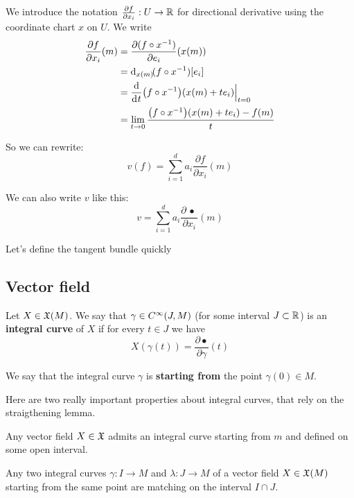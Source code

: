 	We introduce the notation $\frac{\partial{f}}{\partial{x_i}}: U \to \mathbb{R}$ for directional derivative using the coordinate chart $x$ on $U$. We write
	\begin{align*}
		\frac{\partial{f}}{\partial{x_i}}(m) &= \frac{\partial{(f \circ x^{-1})}}{\partial{e_i}}(x(m)) \\
		                                     &= \di[x(m)](f \circ x^{-1})[e_i] \\
		                                     &= \frac{\d}{\di{t}} \big( f \circ x^{-1} \big)(x(m) + t e_i) \Big|_{t=0} \\
		                                     &= \lim_{t \to 0} \frac{\big( f \circ x^{-1} \big)(x(m) + t e_i) - f(m)}{t}
	\end{align*}

	So we can rewrite:
	$$
		v(f) = \sum_{i=1}^d a_i \frac{\partial f}{\partial{x_i}}(m)
	$$

	We can also write $v$ like this:
	$$
		v = \sum_{i=1}^d a_i \frac{\partial \,\bullet\,}{\partial{x_i}}(m)
	$$

	Let's define the tangent bundle quickly

	\subsection{Vector field}

	\begin{definition}
		Let $X \in \mathfrak{X}(M)$.
		We say that $\gamma \in C^\infty(J,M)$ (for some interval $J \subset \mathbb{R}$) is an \textbf{integral curve} of $X$ if for every $t \in J$ we have
		$$
			X(\gamma(t)) = \frac{\partial \bullet}{\partial \gamma}(t)
		$$

		We say that the integral curve $\gamma$ is \textbf{starting from} the point $\gamma(0) \in M$.
	\end{definition}

	Here are two really important properties about integral curves, that rely on the straigthening lemma.

	\begin{prop}
		Any vector field $X \in \mathfrak{X}$ admits an integral curve starting from $m$ and defined on some open interval.
	\end{prop}

	\begin{prop}
		Any two integral curves $\gamma: I \to M$ and $\lambda: J \to M$ of a vector field $X \in \mathfrak{X}(M)$ starting from the same point are matching on the interval $I \cap J$.
	\end{prop}

